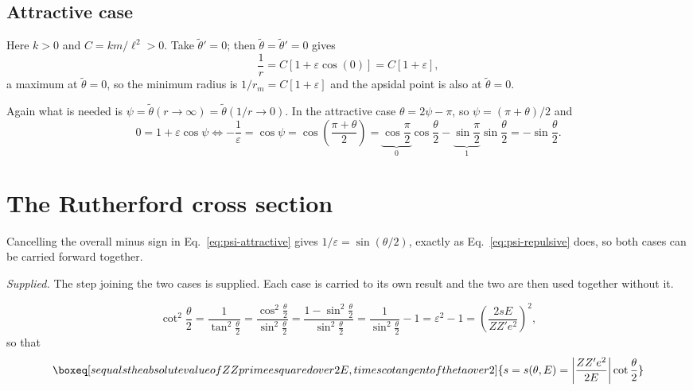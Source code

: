 \documentclass[11pt]{article}
\newcommand{\orbang}{\tilde\theta}
\newcommand{\supplied}[1]{\par\smallskip\noindent\emph{Supplied.} #1\par\smallskip}
\begin{document}
\subsection{Attractive case}

Here $k>0$ and $C = km/\ell^{2} > 0$. Take $\orbang' = 0$; then
$\orbang = \orbang' = 0$ gives
%
\begin{equation}\label{eq:attractive-orbit}
  \frac{1}{r} = C\left[1 + \varepsilon\cos(0)\right] = C\left[1+\varepsilon\right],
\end{equation}
%
a maximum at $\orbang = 0$, so the minimum radius is
$1/r_m = C\left[1+\varepsilon\right]$ and the apsidal point is also at
$\orbang = 0$.

Again what is needed is $\psi = \orbang(r\to\infty) = \orbang(1/r\to 0)$. In the
attractive case $\theta = 2\psi - \pi$, so $\psi = (\pi+\theta)/2$ and
%
\begin{equation}\label{eq:psi-attractive}
  0 = 1 + \varepsilon\cos\psi
  \iff
  -\frac{1}{\varepsilon} = \cos\psi = \cos\!\left(\frac{\pi+\theta}{2}\right)
    = \underbrace{\cos\frac{\pi}{2}}_{0}\cos\frac{\theta}{2}
    - \underbrace{\sin\frac{\pi}{2}}_{1}\sin\frac{\theta}{2}
    = -\sin\frac{\theta}{2} .
\end{equation}

\section{The Rutherford cross section}

Cancelling the overall minus sign in Eq.~\eqref{eq:psi-attractive} gives
$1/\varepsilon = \sin(\theta/2)$, exactly as
Eq.~\eqref{eq:psi-repulsive} does, so both cases can be carried forward
together.

\supplied{The step joining the two cases is supplied. Each case is carried to
its own result and the two are then used together without it.}

\begin{equation}\label{eq:cot2}
  \cot^{2}\frac{\theta}{2}
    = \frac{1}{\tan^{2}\frac{\theta}{2}}
    = \frac{\cos^{2}\frac{\theta}{2}}{\sin^{2}\frac{\theta}{2}}
    = \frac{1-\sin^{2}\frac{\theta}{2}}{\sin^{2}\frac{\theta}{2}}
    = \frac{1}{\sin^{2}\frac{\theta}{2}} - 1
    = \varepsilon^{2} - 1
    = \left(\frac{2sE}{Z Z' e^{2}}\right)^{2},
\end{equation}
%
so that
%
\begin{equation}\label{eq:s-of-theta}
  \boxeq[s equals the absolute value of Z Z prime e squared over 2 E, times
  cotangent of theta over 2]{%
    s = s(\theta,E) = \left\lvert \frac{Z Z' e^{2}}{2E} \right\rvert
        \cot\frac{\theta}{2} }
\end{equation}
\end{document}
